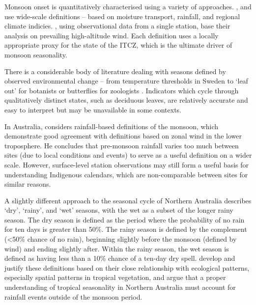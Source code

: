 Monsoon onset is quantitatively characterised using a variety of approaches.
\citet{sultan2003,fasullo2002}, and \citet{wu1998} use wide-scale definitions
-- based on moisture transport, rainfall, and regional climate indicies.
\citet{hendon1990}, using observational data from a single station, base their
analysis on prevailing high-altitude wind.  Each definition uses a
locally appropriate proxy for the state of the ITCZ,
which is the ultimate driver of monsoon seasonality.


There is a considerable body of literature dealing with seasons defined
by observed environmental change -- from temperature thresholds in Sweden
 to `leaf out' for botanists \citep[eg.][]{allstadt2015}
or butterflies for zoologists \citep[eg.][]{forister2003,roy2000}.
Indicators which cycle through qualitatively distinct states, such as deciduous
leaves, are relatively accurate and easy to interpret but may be unavailable
in some contexts.

In Australia, \citet{holland1985} considers rainfall-based definitions of the
monsoon, which demonstrate good agreement with definitions based on zonal
wind in the lower troposphere.  He concludes that pre-monsoon
rainfall varies too much between sites (due to local conditions and events)
to serve as a useful definition on a wider scale.
%
However, surface-level station observations may still form a useful basis for
understanding Indigenous calendars, which are non-comparable between sites
for similar reasons.

A slightly different approach to the seasonal cycle of Northern Australia
describes `dry', `rainy', and `wet' seasons, with the wet as a subset of the
longer rainy season.  The dry season is defined as the period where the probability
of no rain for ten days is greater than 50\%.  The rainy season is defined by
the complement (\textless50\% chance of no rain), beginning slightly before the
monsoon (defined by wind) and ending slightly after.  Within the rainy season, the wet season
is defined as having less than a 10\% chance of a ten-day dry spell.
%
\citet{cook2001} develop and justify these definitions based on their close relationship with
ecological patterns, especially spatial patterns in tropical vegetation,
and argue that a proper understanding of tropical seasonality in Northern
Australia must account for rainfall events outside of the monsoon period.




